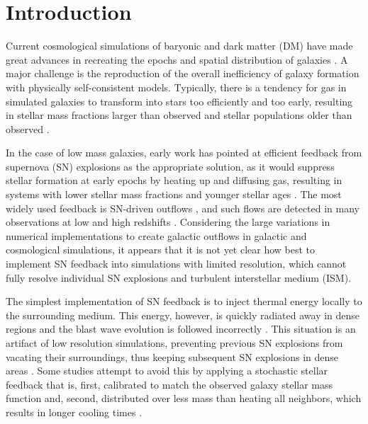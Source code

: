 \documentclass[iop]{emulateapj}
\begin{document}

\section{Introduction}
Current cosmological simulations of baryonic and dark matter (DM) have made great advances in recreating the epochs and spatial distribution of galaxies \citep[see][for reviews]{Bertschinger98, Springel10, Somerville15}. A major challenge is the reproduction of the overall inefficiency of galaxy formation with physically self-consistent models. Typically, there is a tendency for gas in simulated galaxies to transform into stars too efficiently and too early, resulting in stellar mass fractions larger than observed and stellar populations older than observed \citep[e.g.,][]{White91, Keres09, Guo10, Moster13}.

In the case of low mass galaxies, early work has pointed at efficient feedback from supernova (SN) explosions as the appropriate solution, as it would suppress stellar formation at early epochs by heating up and diffusing gas, resulting in systems with lower stellar mass fractions and younger stellar ages \citep{White91}. The most widely used feedback is SN-driven outflows \citep{Dekel86, Larson74}, and such flows are detected in many observations at low and high redshifts \citep[e.g.,][]{Martin99, Strickland00, Rupke05, Steidel10, Newman12}. Considering the large variations in numerical implementations to create galactic outflows \citep[e.g.,][]{Springel03, Dubois08, Hopkins14, Dave13, Teyssier13, Vogelsberger14, Kimm2015, Schaye15, Simpson15} in galactic and cosmological simulations, it appears that it is not yet clear how best to implement SN feedback into simulations with limited resolution, which cannot fully resolve individual SN explosions and turbulent interstellar medium (ISM).

The simplest implementation of SN feedback is to inject thermal energy locally to the surrounding medium. This energy, however, is quickly radiated away in dense regions and the blast wave evolution is followed incorrectly \citep{Navarro93} \citep[see][for attempts to follow the blast wave evolution by turning off ``feedback'' or ``radiative losses'']{Stinson06}. This situation is an artifact of low resolution simulations, preventing previous SN explosions from vacating their surroundings, thus keeping subsequent SN explosions in dense areas \citep[see e.g.,][]{Dalla12, Kimm2015}. Some studies attempt to avoid this by applying a stochastic stellar feedback that is, first, calibrated to match the observed galaxy stellar mass function and, second, distributed over less mass than heating all neighbors, which results in longer cooling times \citep[see studies with the Evolution and Assembly of Galaxies and their Environments ---\textsc{Eagle}--- simulation, e.g.,][]{Schaye15, Furlong2015}.
\end{document}
